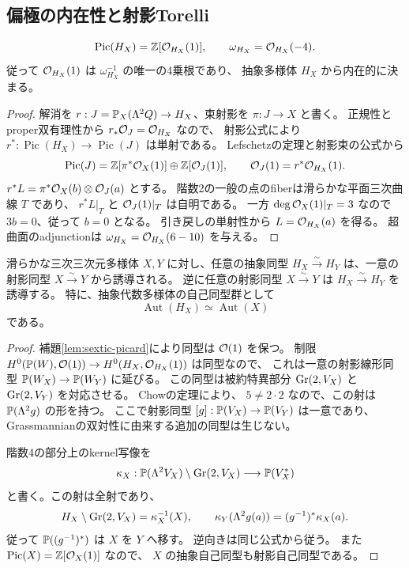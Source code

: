 \subsection{偏極の内在性と射影Torelli}

\begin{lemma}[六次超曲面のPicard群]\label{lem:sextic-picard}
\[
 \operatorname{Pic}(H_X)=\mathbb Z[\mathcal O_{H_X}(1)],\qquad
 \omega_{H_X}=\mathcal O_{H_X}(-4).
\]
従って $\mathcal O_{H_X}(1)$ は $\omega_{H_X}^{-1}$ の唯一の4乗根であり、
抽象多様体 $H_X$ から内在的に決まる。
\end{lemma}

\begin{proof}
解消を $r:J=\mathbb P_X(\Lambda^2Q)\to H_X$、束射影を $\pi:J\to X$ と書く。
正規性とproper双有理性から $r_*\mathcal O_J=\mathcal O_{H_X}$ なので、
射影公式により $r^*:\operatorname{Pic}(H_X)\to\operatorname{Pic}(J)$ は単射である。
Lefschetzの定理\cite[Expos\'e XII, Corollaire 3.7]{SGA2}と射影束の公式から
\[
 \operatorname{Pic}(J)
 =\mathbb Z[\pi^*\mathcal O_X(1)]\oplus\mathbb Z[\mathcal O_J(1)],\qquad
 \mathcal O_J(1)=r^*\mathcal O_{H_X}(1).
\]
$r^*L=\pi^*\mathcal O_X(b)\otimes\mathcal O_J(a)$ とする。
階数2の一般の点のfiberは滑らかな平面三次曲線 $T$ であり、
$r^*L|_T$ と $\mathcal O_J(1)|_T$ は自明である。
一方 $\deg\mathcal O_X(1)|_T=3$ なので $3b=0$、従って $b=0$ となる。
引き戻しの単射性から $L=\mathcal O_{H_X}(a)$ を得る。
超曲面のadjunctionは $\omega_{H_X}=\mathcal O_{H_X}(6-10)$ を与える。
\end{proof}

\begin{theorem}[六次超曲面のTorelli]\label{thm:sextic-torelli}
滑らかな三次三次元多様体 $X,Y$ に対し、任意の抽象同型
$H_X\xrightarrow{\sim}H_Y$ は、一意の射影同型 $X\xrightarrow{\sim}Y$ から誘導される。
逆に任意の射影同型 $X\xrightarrow{\sim}Y$ は $H_X\xrightarrow{\sim}H_Y$ を誘導する。
特に、抽象代数多様体の自己同型群として
\[
                       \operatorname{Aut}(H_X)\simeq\operatorname{Aut}(X)
\]
である。
\end{theorem}

\begin{proof}
補題\ref{lem:sextic-picard}により同型は $\mathcal O(1)$ を保つ。
制限 $H^0(\mathbb P(W),\mathcal O(1))\to H^0(H_X,\mathcal O_{H_X}(1))$ は同型なので、
これは一意の射影線形同型 $\mathbb P(W_X)\to\mathbb P(W_Y)$ に延びる。
この同型は被約特異部分 $\operatorname{Gr}(2,V_X)$ と $\operatorname{Gr}(2,V_Y)$ を対応させる。
Chowの定理\cite[Section II.1]{ChowGrass}\cite[Theorem 3.6]{GhorpadeKaipa}により、
$5\ne2\cdot2$ なので、この射は $\mathbb P(\Lambda^2g)$ の形を持つ。
ここで射影同型 $[g]:\mathbb P(V_X)\to\mathbb P(V_Y)$ は一意であり、
Grassmannianの双対性に由来する追加の同型は生じない。

階数4の部分上のkernel写像を
\[
 \kappa_X:\mathbb P(\Lambda^2V_X)\setminus\operatorname{Gr}(2,V_X)\longrightarrow\mathbb P(V_X^*)
\]
と書く。この射は全射であり、
\[
 H_X\setminus\operatorname{Gr}(2,V_X)=\kappa_X^{-1}(X),\qquad
 \kappa_Y(\Lambda^2g(a))=(g^{-1})^*\kappa_X(a).
\]
従って $\mathbb P((g^{-1})^*)$ は $X$ を $Y$ へ移す。
逆向きは同じ公式から従う。
また $\operatorname{Pic}(X)=\mathbb Z[\mathcal O_X(1)]$ なので、
$X$ の抽象自己同型も射影自己同型である。
\end{proof}

